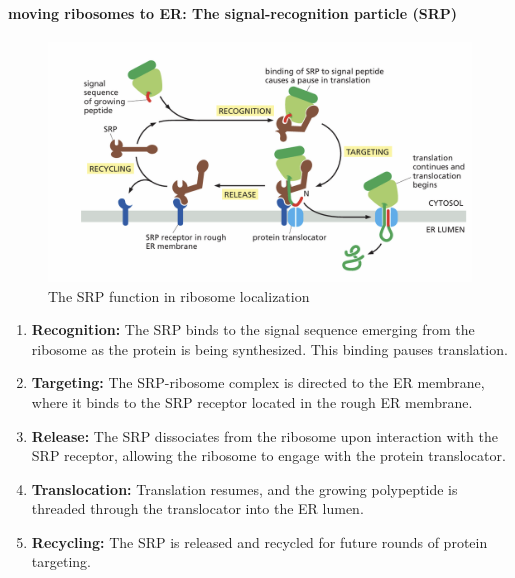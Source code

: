 \documentclass[../main.tex]{subfiles}
\begin{document}
\paragraph{moving ribosomes to ER: The signal-recognition particle (SRP)}
\begin{figure}[H]
    \centering
    \includegraphics[width=1\linewidth]{SRP.png}
    \caption{The SRP function in ribosome localization}
    \label{fig:enter-label}
\end{figure}
\begin{enumerate}
    \item \textbf{Recognition:} The SRP binds to the signal sequence emerging from the ribosome as the protein is being synthesized. This binding pauses translation.
    
    \item \textbf{Targeting:} The SRP-ribosome complex is directed to the ER membrane, where it binds to the SRP receptor located in the rough ER membrane.
    
    \item \textbf{Release:} The SRP dissociates from the ribosome upon interaction with the SRP receptor, allowing the ribosome to engage with the protein translocator.
    
    \item \textbf{Translocation:} Translation resumes, and the growing polypeptide is threaded through the \gls{translocator} into the ER lumen.
    
    \item \textbf{Recycling:} The SRP is released and recycled for future rounds of protein targeting.
\end{enumerate}
\end{document}
